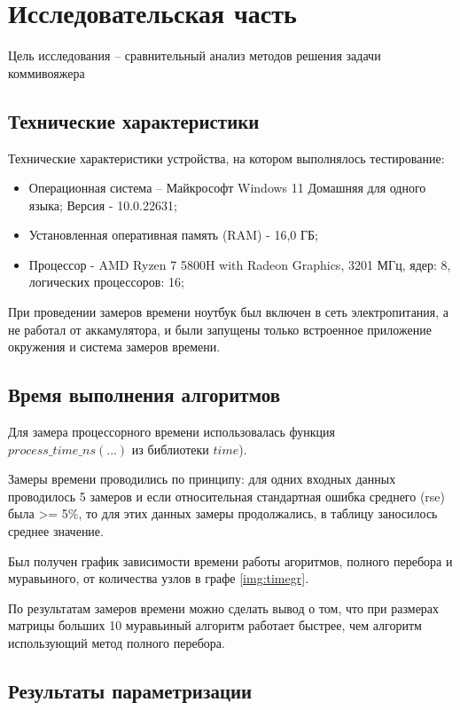 \chapter{Исследовательская часть}

Цель исследования -- сравнительный анализ методов решения задачи коммивояжера

\section{Технические характеристики}
Технические характеристики устройства, на котором выполнялось тестирование:
\begin{itemize}
	\item {Операционная система – Майкрософт Windows 11 Домашняя для одного языка; Версия - 10.0.22631;}
	\item {Установленная оперативная память (RAM) - 16,0 ГБ;}
	\item {Процессор - AMD Ryzen 7 5800H with Radeon Graphics, 3201 МГц, ядер: 8, логических процессоров: 16;}
\end{itemize}

При проведении замеров времени ноутбук был включен в сеть электропитания, а не работал от аккамулятора, и были запущены только встроенное приложение окружения и система замеров времени.

\section{Время выполнения алгоритмов}
Для замера процессорного времени использовалась функция $process\_time\_ns(...)$ из библиотеки $time$\cite{python-time}).

Замеры времени проводились по принципу: для одних входных данных проводилось 5 замеров и если относительная стандартная ошибка среднего (rse) была >= 5\%, то для этих данных замеры продолжались, в таблицу заносилось среднее значение.

Был получен график зависимости времени работы агоритмов, полного перебора и муравьиного,  от количества узлов в графе \ref{img:timegr}.
\FloatBarrier
{}
\FloatBarrier

По результатам замеров времени можно сделать вывод о том, что при размерах матрицы больших 10 муравьиный алгоритм работает быстрее, чем алгоритм использующий метод полного перебора.

\section{Результаты параметризации}

